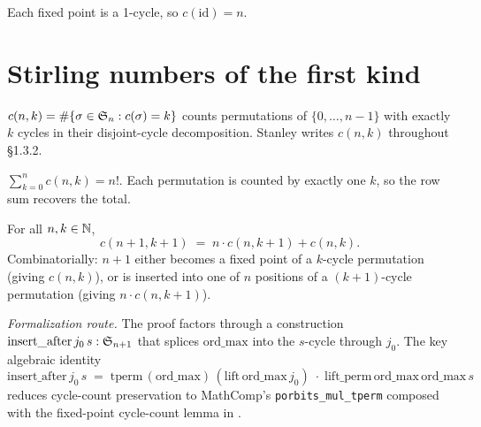 \begin{lemma}
  \label{lem:cycle_count_id}
  \rocqok
  Each fixed point is a 1-cycle, so $c(\mathrm{id}) = n$.
\end{lemma}

\section{Stirling numbers of the first kind}

\begin{definition}
  \label{def:stirling_c}
  \rocqok
  $c(n, k) = \#\{\sigma \in \mathfrak{S}_{n} : c(\sigma) = k\}$ counts
  permutations of $\{0, \dots, n-1\}$ with exactly $k$ cycles in their
  disjoint-cycle decomposition.  Stanley writes $c(n, k)$ throughout
  \S1.3.2.
\end{definition}

\begin{lemma}
  \label{lem:stirling_c_row_sum_fact}
  \rocqok
  $\sum_{k=0}^{n} c(n, k) = n!$.  Each permutation is counted by
  exactly one $k$, so the row sum recovers the total.
\end{lemma}

\begin{theorem}
  \label{thm:stirling_c_rec}
  \rocqok
  For all $n, k \in \mathbb{N}$,
  \[
    c(n+1, k+1) \;=\; n \cdot c(n, k+1) + c(n, k).
  \]
  Combinatorially: $n+1$ either becomes a fixed point of a
  $k$-cycle permutation (giving $c(n, k)$), or is inserted into one
  of $n$ positions of a $(k+1)$-cycle permutation (giving
  $n \cdot c(n, k+1)$).

  \emph{Formalization route.}  The proof factors through a
  construction $\mathrm{insert\_after}\,j_0\,s : \mathfrak{S}_{n+1}$ that
  splices $\mathrm{ord\_max}$ into the $s$-cycle through $j_0$.
  The key algebraic identity
  \[
    \mathrm{insert\_after}\,j_0\,s
    \;=\;
    \mathrm{tperm}\,(\mathrm{ord\_max})\,(\mathrm{lift}\,\mathrm{ord\_max}\,j_0)
    \;\cdot\;
    \mathrm{lift\_perm}\,\mathrm{ord\_max}\,\mathrm{ord\_max}\,s
  \]
  reduces cycle-count preservation to MathComp's
  \texttt{porbits\_mul\_tperm} composed with the fixed-point
  cycle-count lemma in
  .
\end{theorem}

